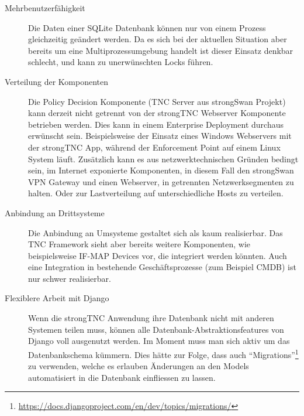 \begin{description}
	\item[Mehrbenutzerfähigkeit] Die Daten einer SQLite Datenbank können nur von
	einem Prozess gleichzeitig geändert werden. Da es sich bei der aktuellen
	Situation aber bereits um eine Multiprozessumgebung handelt ist dieser Einsatz
	denkbar schlecht, und kann zu unerwünschten Locks führen.

	\item[Verteilung der Komponenten] Die Policy Decision Komponente (TNC Server
	aus strongSwan Projekt) kann derzeit nicht getrennt von der strongTNC Webserver
	Komponente betrieben werden. Dies kann in einem Enterprise Deployment
	durchaus erwünscht sein. Beispielsweise der Einsatz eines Windows Webservers
	mit der strongTNC App, während der Enforcement Point auf einem Linux System
	läuft. Zusätzlich kann es aus netzwerktechnischen Gründen bedingt sein, im
	Internet exponierte Komponenten, in diesem Fall den strongSwan VPN Gateway und
	einen Webserver, in getrennten Netzwerksegmenten zu halten. Oder zur
	Lastverteilung auf unterschiedliche Hosts zu verteilen.

	\item[Anbindung an Drittsysteme] Die Anbindung an Umsysteme gestaltet sich als
	kaum realisierbar. Das TNC Framework sieht aber bereits weitere Komponenten,
	wie beispielsweise IF-MAP Devices vor, die integriert werden könnten. Auch eine
	Integration in bestehende Geschäftsprozesse (zum Beispiel CMDB) ist nur schwer realisierbar.
	
	\item[Flexiblere Arbeit mit Django] Wenn die strongTNC Anwendung ihre Datenbank
	nicht mit anderen Systemen teilen muss, können alle
	Datenbank-Abstraktionsfeatures von Django voll ausgenutzt werden. Im Moment muss man sich aktiv um das Datenbankschema kümmern. Dies hätte zur Folge, dass
	auch
	\enquote{Migrations}\footnote{\url{https://docs.djangoproject.com/en/dev/topics/migrations/}} zu verwenden, welche es erlauben Änderungen an den Models automatisiert in die Datenbank einfliessen zu lassen.
	
\end{description} 

